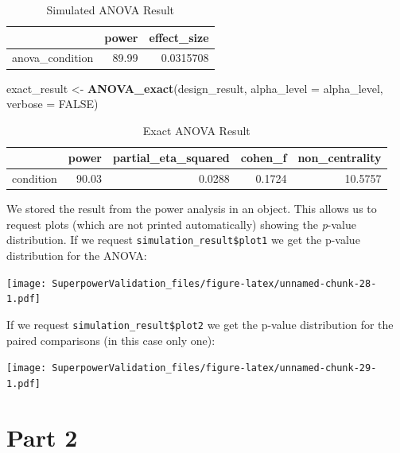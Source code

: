 \documentclass[]{book}
\newenvironment{Shaded}{\begin{snugshade}}{\end{snugshade}}
\newcommand{\DataTypeTok}[1]{\textcolor[rgb]{0.13,0.29,0.53}{#1}}
\newcommand{\KeywordTok}[1]{\textcolor[rgb]{0.13,0.29,0.53}{\textbf{#1}}}
\newcommand{\NormalTok}[1]{#1}
\newcommand{\OtherTok}[1]{\textcolor[rgb]{0.56,0.35,0.01}{#1}}
\newcommand{\StringTok}[1]{\textcolor[rgb]{0.31,0.60,0.02}{#1}}
\begin{document}
\begin{table}[!h]

\caption{\label{tab:unnamed-chunk-25}Simulated ANOVA Result}
\centering
\begin{tabular}{l|r|r}
\hline
  & power & effect\_size\\
\hline
anova\_condition & 89.99 & 0.0315708\\
\hline
\end{tabular}
\end{table}

\begin{Shaded}
\begin{Highlighting}[]
\NormalTok{exact_result <-}\StringTok{ }\KeywordTok{ANOVA_exact}\NormalTok{(design_result,}
                            \DataTypeTok{alpha_level =}\NormalTok{ alpha_level,}
                            \DataTypeTok{verbose =} \OtherTok{FALSE}\NormalTok{)}
\end{Highlighting}
\end{Shaded}

\begin{table}[!h]

\caption{\label{tab:unnamed-chunk-27}Exact ANOVA Result}
\centering
\begin{tabular}{l|r|r|r|r}
\hline
  & power & partial\_eta\_squared & cohen\_f & non\_centrality\\
\hline
condition & 90.03 & 0.0288 & 0.1724 & 10.5757\\
\hline
\end{tabular}
\end{table}

We stored the result from the power analysis in an object. This allows us to request plots (which are not printed automatically) showing the \emph{p}-value distribution. If we request \texttt{simulation\_result\$plot1} we get the p-value distribution for the ANOVA:

\texttt{[image: SuperpowerValidation\_files/figure-latex/unnamed-chunk-28-1.pdf]}

If we request \texttt{simulation\_result\$plot2} we get the p-value distribution for the paired comparisons (in this case only one):

\texttt{[image: SuperpowerValidation\_files/figure-latex/unnamed-chunk-29-1.pdf]}

\hypertarget{part-2}{%
\section{Part 2}\label{part-2}}
\end{document}
